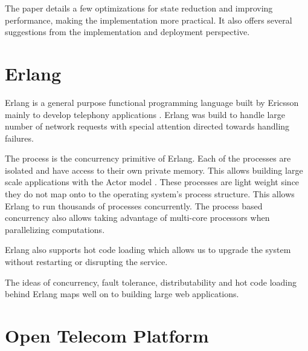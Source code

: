 The paper \citep{Robbert2011} details a few optimizations for state reduction
and improving performance, making the implementation more practical.
It also offers several suggestions from the implementation and
deployment perspective.

\section{Erlang}

Erlang \citep{erlang} is a general purpose functional
programming%
 language built by Ericsson mainly to develop telephony applications
\citep{Armstrong07}. Erlang was build to handle large number of network
requests with special attention directed towards handling failures.

The process is the concurrency primitive of Erlang. Each of the processes are
isolated and have access to their own private memory. This allows building
large scale applications with the Actor model%
\citep{Clinger81}. These processes are light weight since they do not map onto
to the operating system's process structure. This allows Erlang to run
thousands of processes concurrently. The process based concurrency also allows
taking advantage of multi-core processors when parallelizing computations.

Erlang also supports hot code loading%
which allows us to upgrade the system
without restarting or disrupting the service.

The ideas of concurrency, fault tolerance, distributability and hot code loading
behind Erlang maps well on to building large web applications.

\section{Open Telecom Platform}
\label{section:concepts.otp}

